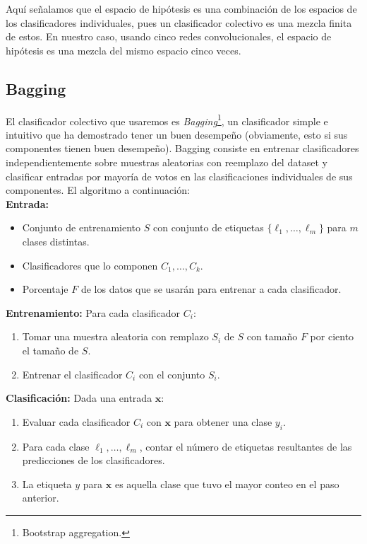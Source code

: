 \documentclass[spanish,11pt,letterpaper]{article}
\renewcommand{\vec}[1]{\mathbf{#1}}
\begin{document}
Aquí señalamos que el espacio de hipótesis es una combinación de los espacios
de los clasificadores individuales, pues un clasificador colectivo es una mezcla
finita de estos. En nuestro caso, usando cinco redes convolucionales, el espacio
de hipótesis es una mezcla del mismo espacio cinco veces.

\subsection{Bagging}

El clasificador colectivo que usaremos es \textit{Bagging}\footnote{Bootstrap
aggregation.}, un clasificador simple e intuitivo que ha demostrado tener un buen
desempeño (obviamente, esto si sus componentes tienen buen desempeño). Bagging
consiste en entrenar clasificadores independientemente sobre muestras aleatorias
con reemplazo del dataset y clasificar entradas por mayoría de votos en las
clasificaciones individuales de sus componentes. El algoritmo a continuación:\\
\textbf{Entrada:}
\begin{itemize}
  \item Conjunto de entrenamiento $S$ con conjunto de etiquetas
  $\{\ell_1,\ldots,\ell_m\}$ para $m$ clases distintas.
  \item Clasificadores que lo componen $C_1,\ldots,C_k$.
  \item Porcentaje $F$ de los datos que se usarán para entrenar a cada clasificador.
\end{itemize}
\textbf{Entrenamiento:} Para cada clasificador $C_i$:
\begin{enumerate}
  \item Tomar una muestra aleatoria con remplazo $S_i$ de $S$ con tamaño $F$ por
  ciento el tamaño de $S$.
  \item Entrenar el clasificador $C_i$ con el conjunto $S_i$.
\end{enumerate}
\textbf{Clasificación:} Dada una entrada $\vec{x}$:
\begin{enumerate}
  \item Evaluar cada clasificador $C_i$ con $\vec{x}$ para obtener una clase $y_i$.
  \item Para cada clase $\ell_1,\ldots,\ell_m$, contar el número de etiquetas
  resultantes de las predicciones de los clasificadores.
  \item La etiqueta $y$ para $\vec{x}$ es aquella clase que tuvo el mayor conteo
  en el paso anterior.
\end{enumerate}
\end{document}
